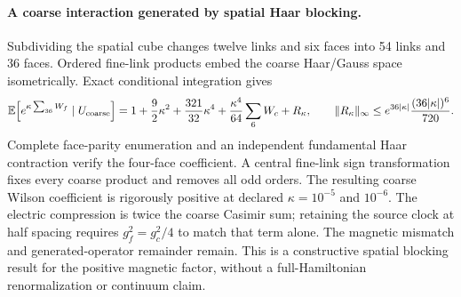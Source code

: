 \paragraph{A coarse interaction generated by spatial Haar blocking.}
Subdividing the spatial cube changes twelve links and six faces into
54 links and 36 faces.  Ordered fine-link products embed the coarse
Haar/Gauss space isometrically.  Exact conditional integration gives
\[
 \mathbb E\!\left[e^{\kappa\sum_{36}W_f}\mid U_{\rm coarse}\right]
 =1+\frac92\kappa^2+\frac{321}{32}\kappa^4
  +\frac{\kappa^4}{64}\sum_6W_c+R_\kappa,
 \qquad
 \|R_\kappa\|_\infty\leq
 e^{36|\kappa|}\frac{(36|\kappa|)^6}{720}.
\]
Complete face-parity enumeration and an independent fundamental Haar
contraction verify the four-face coefficient.  A central fine-link sign
transformation fixes every coarse product and removes all odd orders.
The resulting coarse Wilson coefficient is rigorously positive at
declared $\kappa=10^{-5}$ and $10^{-6}$.
The electric compression is twice the coarse Casimir sum; retaining the
source clock at half spacing requires $g_f^2=g_c^2/4$ to match that term
alone.  The magnetic mismatch and generated-operator remainder remain.
This is a constructive spatial blocking result for the positive magnetic
factor, without a full-Hamiltonian renormalization or continuum claim.
